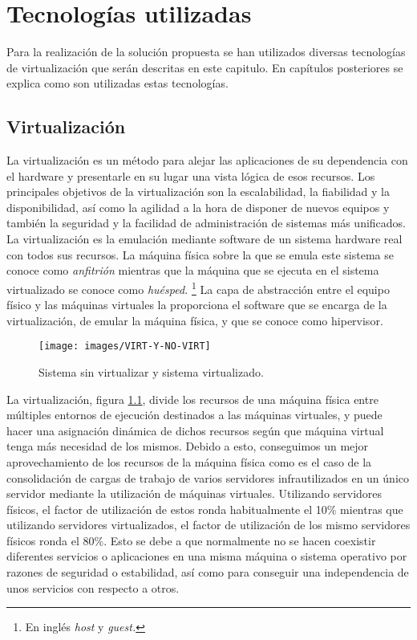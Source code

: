\documentclass[spanisheDIVcalc,twoside,parskip-,pointlessnumbers,final]{scrbook}
\newcommand{\clearemptydoublepage}{\newpage{\pagestyle{empty}\cleardoublepage}}
\begin{document}
\clearemptydoublepage
\chapter{Tecnologías utilizadas}

Para la realización de la solución propuesta se han utilizados diversas
tecnologías de virtualización que serán descritas en este capitulo.
En capítulos posteriores se explica como son utilizadas estas tecnologías.


\section{Virtualización}

La virtualización es un método para alejar las aplicaciones de su
dependencia con el hardware y presentarle en su lugar una vista lógica
de esos recursos. Los principales objetivos de la virtualización son
la escalabilidad, la fiabilidad y la disponibilidad, así como la agilidad
a la hora de disponer de nuevos equipos y también la seguridad y la
facilidad de administración de sistemas más unificados. La virtualización
es la emulación mediante software de un sistema hardware real con
todos sus recursos. La máquina física sobre la que se emula este sistema
se conoce como \emph{anfitrión} mientras que la máquina que se ejecuta
en el sistema virtualizado se conoce como \emph{huésped.}%
\footnote{En inglés \emph{host }y \emph{guest.}%
} La capa de abstracción entre el equipo físico y las máquinas virtuales
la proporciona el software que se encarga de la virtualización, de
emular la máquina física, y que se conoce como hipervisor.

\begin{figure}[htpb]
\begin{centering}
\texttt{[image: images/VIRT-Y-NO-VIRT]}
\par\end{centering}

\centering{}\caption{Sistema sin virtualizar y sistema virtualizado.}
\label{Virtualizacion vs sin virtualizacion}
\end{figure}


La virtualización, figura \ref{Virtualizacion vs sin virtualizacion},
divide los recursos de una máquina física entre múltiples entornos
de ejecución destinados a las máquinas virtuales, y puede hacer una
asignación dinámica de dichos recursos según que máquina virtual tenga
más necesidad de los mismos. Debido a esto, conseguimos un mejor aprovechamiento
de los recursos de la máquina física como es el caso de la consolidación
de cargas de trabajo de varios servidores infrautilizados en un único
servidor mediante la utilización de máquinas virtuales. Utilizando
servidores físicos, el factor de utilización de estos ronda habitualmente
el 10\% mientras que utilizando servidores virtualizados, el factor
de utilización de los mismo servidores físicos ronda el 80\%. Esto
se debe a que normalmente no se hacen coexistir diferentes servicios
o aplicaciones en una misma máquina o sistema operativo por razones
de seguridad o estabilidad, así como para conseguir una independencia
de unos servicios con respecto a otros. 
\end{document}

